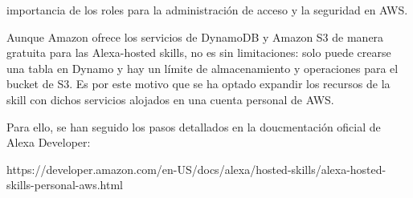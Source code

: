 importancia de los roles para la administración de acceso y la seguridad en AWS.

Aunque Amazon ofrece los servicios de DynamoDB y Amazon S3 de manera gratuita para las Alexa-hosted skills, no es sin limitaciones: solo puede crearse una tabla en Dynamo y hay un límite de almacenamiento y operaciones para el bucket de S3. Es por este motivo que se ha optado expandir los recursos de la skill con dichos servicios alojados en una cuenta personal de AWS. 

Para ello, se han seguido los pasos detallados en la doucmentación oficial de Alexa Developer:

https://developer.amazon.com/en-US/docs/alexa/hosted-skills/alexa-hosted-skills-personal-aws.html

